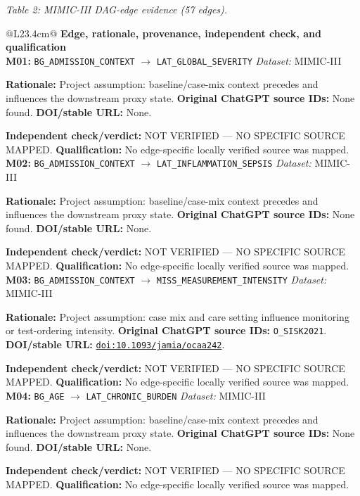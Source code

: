 \begin{center}\textit{Table 2: MIMIC-III DAG-edge evidence (57 edges).}\end{center}
\begin{tabular}{@{}L{23.4cm}@{}}
\toprule
\textbf{Edge, rationale, provenance, independent check, and qualification}\\
\midrule
\textbf{M01:} \nolinkurl{BG_ADMISSION_CONTEXT} $\rightarrow$ \nolinkurl{LAT_GLOBAL_SEVERITY} \hfill \textit{Dataset:} MIMIC-III\par\textbf{Rationale:} Project assumption: baseline/case-mix context precedes and influences the downstream proxy state. \textbf{Original ChatGPT source IDs:} None found. \textbf{DOI/stable URL:} None.\par\textbf{Independent check/verdict:} NOT VERIFIED --- NO SPECIFIC SOURCE MAPPED. \textbf{Qualification:} No edge-specific locally verified source was mapped. \\
\addlinespace[2pt]
\midrule
\textbf{M02:} \nolinkurl{BG_ADMISSION_CONTEXT} $\rightarrow$ \nolinkurl{LAT_INFLAMMATION_SEPSIS} \hfill \textit{Dataset:} MIMIC-III\par\textbf{Rationale:} Project assumption: baseline/case-mix context precedes and influences the downstream proxy state. \textbf{Original ChatGPT source IDs:} None found. \textbf{DOI/stable URL:} None.\par\textbf{Independent check/verdict:} NOT VERIFIED --- NO SPECIFIC SOURCE MAPPED. \textbf{Qualification:} No edge-specific locally verified source was mapped. \\
\addlinespace[2pt]
\midrule
\textbf{M03:} \nolinkurl{BG_ADMISSION_CONTEXT} $\rightarrow$ \nolinkurl{MISS_MEASUREMENT_INTENSITY} \hfill \textit{Dataset:} MIMIC-III\par\textbf{Rationale:} Project assumption: case mix and care setting influence monitoring or test-ordering intensity. \textbf{Original ChatGPT source IDs:} \nolinkurl{O_SISK2021}. \textbf{DOI/stable URL:} \href{https://doi.org/10.1093/jamia/ocaa242}{\nolinkurl{doi:10.1093/jamia/ocaa242}}.\par\textbf{Independent check/verdict:} NOT VERIFIED --- NO SPECIFIC SOURCE MAPPED. \textbf{Qualification:} No edge-specific locally verified source was mapped. \\
\addlinespace[2pt]
\midrule
\textbf{M04:} \nolinkurl{BG_AGE} $\rightarrow$ \nolinkurl{LAT_CHRONIC_BURDEN} \hfill \textit{Dataset:} MIMIC-III\par\textbf{Rationale:} Project assumption: baseline/case-mix context precedes and influences the downstream proxy state. \textbf{Original ChatGPT source IDs:} None found. \textbf{DOI/stable URL:} None.\par\textbf{Independent check/verdict:} NOT VERIFIED --- NO SPECIFIC SOURCE MAPPED. \textbf{Qualification:} No edge-specific locally verified source was mapped. \\

\end{tabular}
